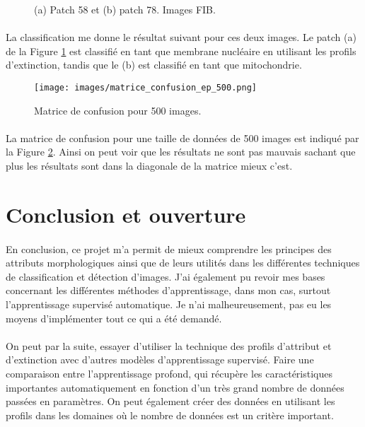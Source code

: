 \documentclass[paper=a4, 11pt]{article}
\begin{document}
\begin{figure}[h]
\centering
{}
\qquad
{}
\caption{(a) Patch 58 et (b) patch 78. Images FIB.}
\label{fig:patch}
\end{figure}

\paragraph{} La classification me donne le résultat suivant pour ces deux images. Le patch (a) de la Figure \ref{fig:patch} est classifié en tant que membrane nucléaire en utilisant les profils d'extinction, tandis que le (b) est classifié en tant que mitochondrie.

\begin{figure}[h]
\centering
\texttt{[image: images/matrice\_confusion\_ep\_500.png]}
\caption{Matrice de confusion pour 500 images.}
\label{fig:confusion}
\end{figure}

\paragraph{} La matrice de confusion pour une taille de données de 500 images est indiqué par la Figure \ref{fig:confusion}. Ainsi on peut voir que les résultats ne sont pas mauvais sachant que plus les résultats sont dans la diagonale de la matrice mieux c'est.

\section{Conclusion et ouverture}
\paragraph{} En conclusion, ce projet m'a permit de mieux comprendre les principes des attributs morphologiques ainsi que de leurs utilités dans les différentes techniques de classification et détection d'images. J'ai également pu revoir mes bases concernant les différentes méthodes d'apprentissage, dans mon cas, surtout l'apprentissage supervisé automatique. Je n'ai malheureusement, pas eu les moyens d'implémenter tout ce qui a été demandé.

\paragraph{} On peut par la suite, essayer d'utiliser la technique des profils d'attribut et d'extinction avec d'autres modèles d'apprentissage supervisé. Faire une comparaison entre l'apprentissage profond, qui récupère les caractéristiques importantes automatiquement en fonction d'un très grand nombre de données passées en paramètres. On peut également créer des données en utilisant les profils dans les domaines où le nombre de données est un critère important.
\end{document}
